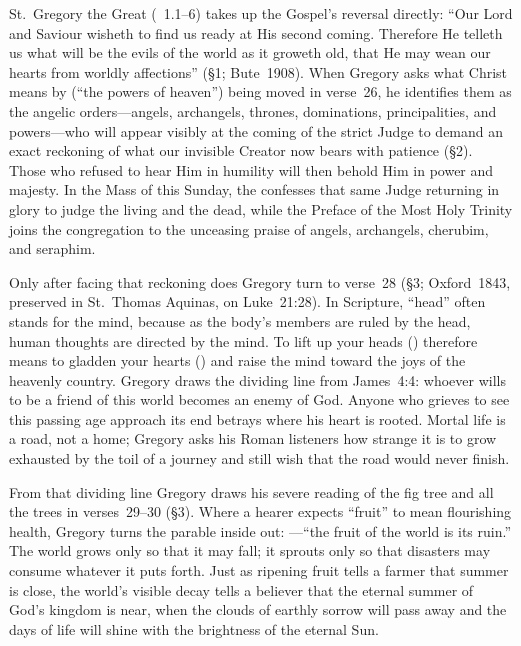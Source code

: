 St.~Gregory the Great (~1.1--6) takes up the Gospel's reversal directly: ``Our Lord and Saviour wisheth to find us ready at His second coming. Therefore He telleth us what will be the evils of the world as it groweth old, that He may wean our hearts from worldly affections'' (\S1; Bute~1908). When Gregory asks what Christ means by  (``the powers of heaven'') being moved in verse~26, he identifies them as the angelic orders---angels, archangels, thrones, dominations, principalities, and powers---who will appear visibly at the coming of the strict Judge to demand an exact reckoning of what our invisible Creator now bears with patience (\S2). Those who refused to hear Him in humility will then behold Him in power and majesty. In the Mass of this Sunday, the  confesses that same Judge returning in glory to judge the living and the dead, while the Preface of the Most Holy Trinity joins the congregation to the unceasing praise of angels, archangels, cherubim, and seraphim.

Only after facing that reckoning does Gregory turn to verse~28 (\S3; Oxford~1843, preserved in St.~Thomas Aquinas,  on Luke~21:28). In Scripture, ``head'' often stands for the mind, because as the body's members are ruled by the head, human thoughts are directed by the mind. To lift up your heads () therefore means to gladden your hearts () and raise the mind toward the joys of the heavenly country. Gregory draws the dividing line from James~4:4: whoever wills to be a friend of this world becomes an enemy of God. Anyone who grieves to see this passing age approach its end betrays where his heart is rooted. Mortal life is a road, not a home; Gregory asks his Roman listeners how strange it is to grow exhausted by the toil of a journey and still wish that the road would never finish.

From that dividing line Gregory draws his severe reading of the fig tree and all the trees in verses~29--30 (\S3). Where a hearer expects ``fruit'' to mean flourishing health, Gregory turns the parable inside out: ---``the fruit of the world is its ruin.'' The world grows only so that it may fall; it sprouts only so that disasters may consume whatever it puts forth. Just as ripening fruit tells a farmer that summer is close, the world's visible decay tells a believer that the eternal summer of God's kingdom is near, when the clouds of earthly sorrow will pass away and the days of life will shine with the brightness of the eternal Sun.

